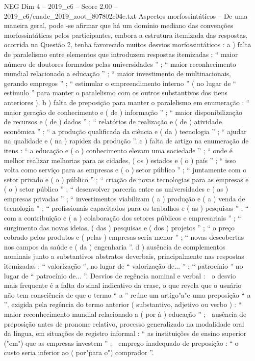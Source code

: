 \begin{textsample}{NEG Dim 4 – 2019\_c6 – Score 2.00 – 2019\_c6/enade\_2019\_zoot\_807802c04e.txt}
Aspectos morfossintáticos – De uma maneira geral, pode -se afirmar que há um domínio mediano das convenções morfossintáticas pelos participantes, embora a estrutura itemizada das respostas, ocorrida na Questão 2, tenha favorecido muitos desvios morfossintáticos : a ) falta de paralelismo entre elementos que introduzem respostas itemizadas : “ maior número de doutores formados pelas universidades ” ; “ maior reconhecimento mundial relacionado a educação ” ; “ maior investimento de multinacionais, gerando empregos ” ; “ estimular o empreendimento interno ” ( no lugar de “ estímulo ” para manter o paralelismo com os outros substantivos dos itens anteriores ). b ) falta de preposição para manter o paralelismo em enumeração : “ maior geração de conhecimento e ( de ) informação ” ; “ maior disponibilização de recursos e ( de ) dados ” ; “ relatórios de realização e ( de ) atividade econômica ” ; “ a produção qualificada da ciência e ( da ) tecnologia ” ; “ ajudar na qualidade e ( na ) rapidez da produção ”. c ) falta de artigo na enumeração de itens : “ a educação e ( o ) conhecimento elevam uma sociedade ” ; “ onde é melhor realizar melhorias para as cidades, ( os ) estados e ( o ) país ” ; “ isso volta como serviço para as empresas e ( o ) setor público ” ; “ juntamente com o setor privado e ( o ) público ” ; “ criação de novas tecnologias para as empresas e ( o ) setor público ” ; “ desenvolver parceria entre as universidades e ( as ) empresas privadas ” ; “ investimentos viabilizam ( a ) produção e ( a ) venda de tecnologia ” ; “ profissionais capacitados para os trabalhos e ( as ) pesquisas ” ; “ com a contribuição e ( a ) colaboração dos setores públicos e empresariais ” ; “ surgimento das novas ideias, ( das ) pesquisas e ( dos ) projetos ” ; “ o preço cobrado pelos produtos e ( pelas ) empresas seria menor ” ; “ novas descobertas nos campos da saúde e ( da ) engenharia ”. d ) ausência de complementos nominais junto a substantivos abstratos deverbais, principalmente nas respostas itemizadas : “ valorização ”, no lugar de “ valorização de... ” ; “ patrocínio ” no lugar de “ patrocínio de... ”.
Desvios de regência nominal e verbal :  o desvio mais frequente é a falta do sinal indicativo da crase, o que revela que o usuário não tem consciência de que o termo “ a ” reúne um artigo"a"e uma preposição “ a ”, exigida pela regência do termo anterior ( substantivo, adjetivo ou verbo ) : “ maior reconhecimento mundial relacionado a ( por à ) educação ” ;  ausência de preposição antes de pronome relativo, processo generalizado na modalidade oral da língua, em situações de registro informal : “ as instituições de ensino superior ("em") que as empresas investem ” ;  emprego inadequado de preposição : “ o custo seria inferior ao ( por"para o") comprador ”.

\end{textsample}
